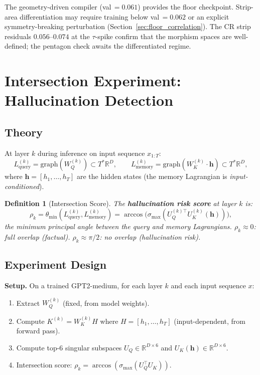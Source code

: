 \documentclass[11pt]{amsart}
\newtheorem{definition}[theorem]{Definition}
\begin{document}
The geometry-driven compiler (val\,$= 0.061$) provides the floor
checkpoint.
Strip-area differentiation may require training below
val\,$= 0.062$ or an explicit symmetry-breaking perturbation
(Section~\ref{sec:floor_correlation}).
The CR strip residuals $0.056$--$0.074$ at the $\tau$-spike
confirm that the morphism spaces are well-defined;
the pentagon check awaits the differentiated regime.

\section{Intersection Experiment: Hallucination Detection}
\label{sec:intersection_exp}

\subsection{Theory}

At layer $k$ during inference on input sequence $x_{1:T}$:
\[
  L_\text{query}^{(k)} = \mathrm{graph}(W_Q^{(k)}) \subset T^*\mathbb{R}^D,
  \qquad
  L_\text{memory}^{(k)} = \mathrm{graph}(W_K^{(k)}\cdot\mathbf{h}) \subset T^*\mathbb{R}^D,
\]
where $\mathbf{h} = [h_1,\ldots,h_T]$ are the hidden states
(the memory Lagrangian is \emph{input-conditioned}).

\begin{definition}[Intersection Score]
The \textbf{hallucination risk score} at layer $k$ is:
\[
  \rho_k = \theta_\mathrm{min}(L_\text{query}^{(k)}, L_\text{memory}^{(k)})
  = \arccos\bigl(\sigma_\mathrm{max}(U_Q^{(k)\top} U_K^{(k)}(\mathbf{h}))\bigr),
\]
the minimum principal angle between the query and memory Lagrangians.
$\rho_k \approx 0$: full overlap (factual).
$\rho_k \approx \pi/2$: no overlap (hallucination risk).
\end{definition}

\subsection{Experiment Design}

\textbf{Setup.} On a trained GPT2-medium, for each layer $k$ and each
input sequence $x$:
\begin{enumerate}
\item Extract $W_Q^{(k)}$ (fixed, from model weights).
\item Compute $K^{(k)} = W_K^{(k)} H$ where $H = [h_1,\ldots,h_T]$
  (input-dependent, from forward pass).
\item Compute top-6 singular subspaces $U_Q \in \mathbb{R}^{D\times 6}$
  and $U_K(\mathbf{h}) \in \mathbb{R}^{D\times 6}$.
\item Intersection score: $\rho_k = \arccos(\sigma_\mathrm{max}(U_Q^\top U_K))$.
\end{enumerate}
\end{document}
